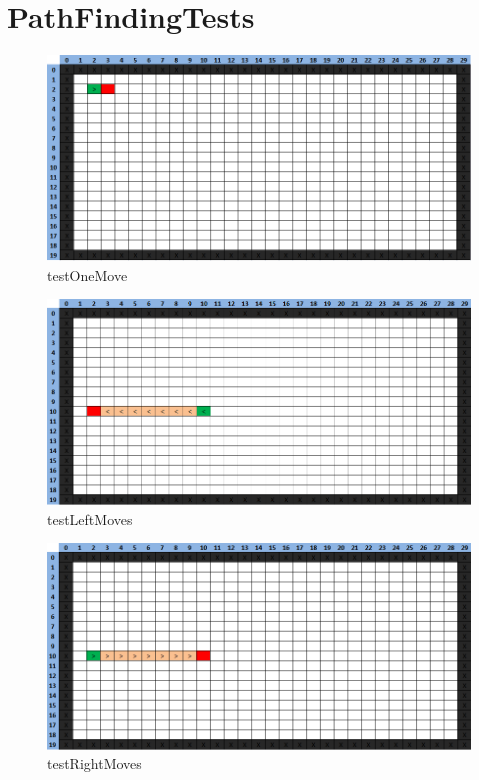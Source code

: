 \documentclass[a4paper]{article}
\begin{document}
\tableofcontents
\section{PathFindingTests}
\begin{figure}[H]
	\centering
	\includegraphics[width=1\textwidth]{PathfindingTest-testOneMove.png}
	\caption{testOneMove}
\end{figure}
\begin{figure}[H]
	\centering
	\includegraphics[width=1\textwidth]{PathfindingTest-testLeftMoves.png}
	\caption{testLeftMoves}
\end{figure}
\begin{figure}[H]
	\centering
	\includegraphics[width=1\textwidth]{PathfindingTest-testRightMoves.png}
	\caption{testRightMoves}
\end{figure}
\end{document}
